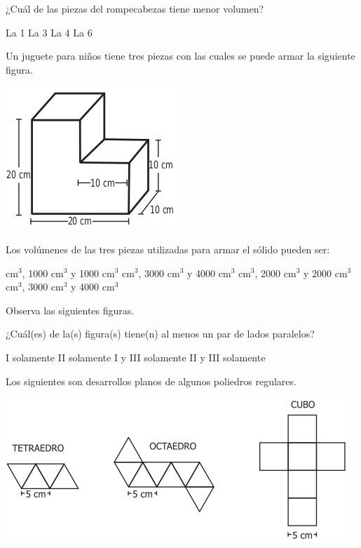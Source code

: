 \documentclass[addpoints]{exam}
\begin{document}
\begin{multicols}{2}
\begin{questions}
¿Cuál de las piezas del rompecabezas tiene menor volumen?

\begin{oneparchoices}
\choice La 1
\choice La 3
\choice La 4
\CorrectChoice La 6
\end{oneparchoices}
\question Un juguete para niños tiene tres piezas con las cuales se puede armar la siguiente figura.
\begin{center}
\includegraphics[scale=.3]{Images/Pantallazo-34.png} 
\end{center}
Los volúmenes de las tres piezas utilizadas para armar el sólido pueden ser:
\begin{choices}
 cm$^{3}$, 1000 cm$^{3}$ y 1000 cm$^{3}$
 cm$^{3}$, 3000 cm$^{3}$ y 4000 cm$^{3}$
 cm$^{3}$, 2000 cm$^{3}$ y 2000 cm$^{3}$
 cm$^{3}$, 3000 cm$^{3}$ y 4000 cm$^{3}$
\end{choices}
\question Observa las siguientes figuras.
\begin{center}
\end{center}
¿Cuál(es) de la(s) figura(s) tiene(n) al menos un par de lados paralelos?
\begin{choices}
\choice I solamente
\choice II solamente
\CorrectChoice I y III solamente
\choice II y III solamente
\end{choices}
\question Los siguientes son desarrollos planos de algunos poliedros regulares.
\begin{center}
\includegraphics[scale=.3]{Images/Pantallazo-35.png}

\end{center}
\end{questions}
\end{multicols}
\end{document}
